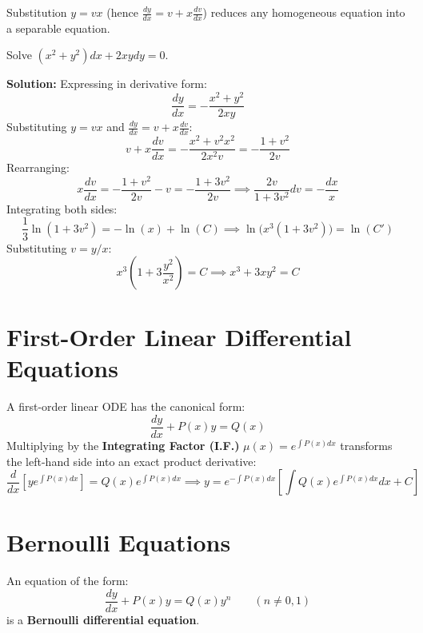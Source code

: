 \documentclass[11pt, a4paper, openany, oneside]{book}
\begin{document}
Substitution $y = v x$ (hence $\frac{dy}{dx} = v + x \frac{dv}{dx}$) reduces any homogeneous equation into a separable equation.

\begin{examplebox}
Solve $(x^2 + y^2)dx + 2xy dy = 0$.

\textbf{Solution:}
Expressing in derivative form:
\[ \frac{dy}{dx} = -\frac{x^2 + y^2}{2xy} \]
Substituting $y = v x$ and $\frac{dy}{dx} = v + x \frac{dv}{dx}$:
\[ v + x \frac{dv}{dx} = -\frac{x^2 + v^2 x^2}{2 x^2 v} = -\frac{1 + v^2}{2v} \]
Rearranging:
\[ x \frac{dv}{dx} = -\frac{1 + v^2}{2v} - v = -\frac{1 + 3v^2}{2v} \implies \frac{2v}{1 + 3v^2} dv = -\frac{dx}{x} \]
Integrating both sides:
\[ \frac{1}{3} \ln(1 + 3v^2) = -\ln(x) + \ln(C) \implies \ln\Big(x^3(1 + 3v^2)\Big) = \ln(C') \]
Substituting $v = y/x$:
\begin{equation}
    x^3 \left(1 + 3\frac{y^2}{x^2}\right) = C \implies x^3 + 3x y^2 = C
\end{equation}
\end{examplebox}

\section{First-Order Linear Differential Equations}

A first-order linear ODE has the canonical form:
\begin{equation}
    \frac{dy}{dx} + P(x)y = Q(x)
\end{equation}
Multiplying by the \textbf{Integrating Factor (I.F.)} $\mu(x) = e^{\int P(x)dx}$ transforms the left-hand side into an exact product derivative:
\begin{equation}
    \frac{d}{dx}\left[ y e^{\int P(x)dx} \right] = Q(x) e^{\int P(x)dx} \implies y = e^{-\int P(x)dx} \left[ \int Q(x) e^{\int P(x)dx} dx + C \right]
\end{equation}

\section{Bernoulli Equations}

\begin{definitionbox}
An equation of the form:
\begin{equation}
    \frac{dy}{dx} + P(x)y = Q(x)y^n \qquad (n \neq 0, 1)
\end{equation}
is a \textbf{Bernoulli differential equation}.
\end{definitionbox}
\end{document}
